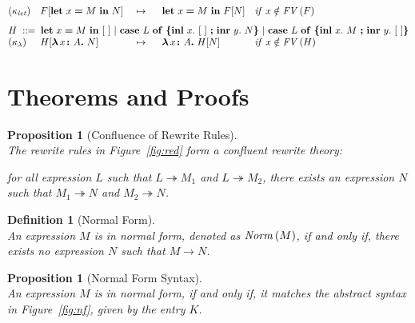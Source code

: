 \documentclass[a4paper]{article}
\makeatletter
\newtheorem{proposition}[theorem]{Proposition}
\newtheorem{definition}{Definition}
\newcommand{\hole}{[\ ]}
\newcommand{\expabs}[3]{\boldsymbol{\lambda}\,#1\boldsymbol{\colon}#2\boldsymbol{.}\ #3}
\newcommand{\expshr}[3]{\mathbf{let}\ #1\boldsymbol{=}#2\ \mathbf{in}\ #3}
\newcommand{\expcas}[5]{\mathbf{case}\ #1\ \mathbf{of}\ \boldsymbol{\{}\mathbf{inl}\ #2.\ #3\ \boldsymbol{;}\ \mathbf{inr}\ #4.\ #5\boldsymbol{\}}}
\newcommand{\fv}[1]{\txt{FV}\,(#1)}
\newcommand{\txt}[1]{\text{\textit{#1}}}
\newcommand{\rewrite}[3]{#1 \overset{#2}\mapsto #3}
\newcommand{\reduce}[3]{#1 \overset{#2}\rightarrow #3}
\newcommand{\reducestar}[3]{#1 \overset{#2}\twoheadrightarrow #3}
\newcommand{\cnd}[1]{\begin{array}[t]{@{}l@{}}\txt{if}\ #1\end{array}}
\newcommand{\norm}[1]{\txt{Norm}\,(#1)}
\makeatother
\begin{document}
\begin{figure*}[h]
\[\begin{array}[t]{@{}lllll@{}}
(\kappa_{\txt{let}})
& F[\expshr{x}{M}{N}]
& \ \rewrite{}{}{}\ \ 
& \expshr{x}{M}{F[N]} 
& \cnd{x \notin \fv{F}} \\[8pt]

\multicolumn{5}{@{}l@{}}{H \mathbin{\ ::=\ } \expshr{x}{M}{\hole}\ |\ \expcas{L}{x}{\hole}{y}{N}\ |\ \expcas{L}{x}{M}{y}{\hole}}\\[0pt]

(\kappa_{\lambda})
& H[\expabs{x}{A}{N}]
& \ \rewrite{}{}{}\ \ 
& \expabs{x}{A}{H[N]}
& \cnd{x \notin \fv{H}} \\[0pt]

\end{array}
\]
\caption{Reduction Rules}
\label{fig:red}
\end{figure*} 

\section{Theorems and Proofs}

\begin{proposition}[Confluence of Rewrite Rules]\ \\
\label{prop_confluency}
The rewrite rules in Figure~\ref{fig:red} form a confluent rewrite
theory:

for all expression $L$ such that $\reducestar{L}{}{M_1}$ and
$\reducestar{L}{}{M_2}$, there exists an expression $N$ such that
$\reducestar{M_1}{}{N}$ and $\reducestar{M_2}{}{N}$.

\end{proposition}
 
\begin{definition}[Normal Form]\ \\
An expression $M$ is in normal form, denoted as $\norm{M}$, if and only
if, there exists no expression $N$ such that $\reduce{M}{}{N}$.
\end{definition}

\begin{proposition}[Normal Form Syntax]\ \\
\label{prop_normal}
An expression $M$ is in normal form, if and only if, it matches the
abstract syntax in Figure~\ref{fig:nf}, given by the entry $K$.
\end{proposition}
 
\end{document}
